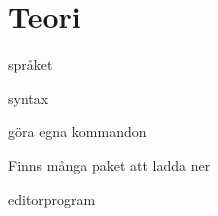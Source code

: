 \section{Teori}
språket

syntax

göra egna kommandon

Finns många paket att ladda ner

editorprogram